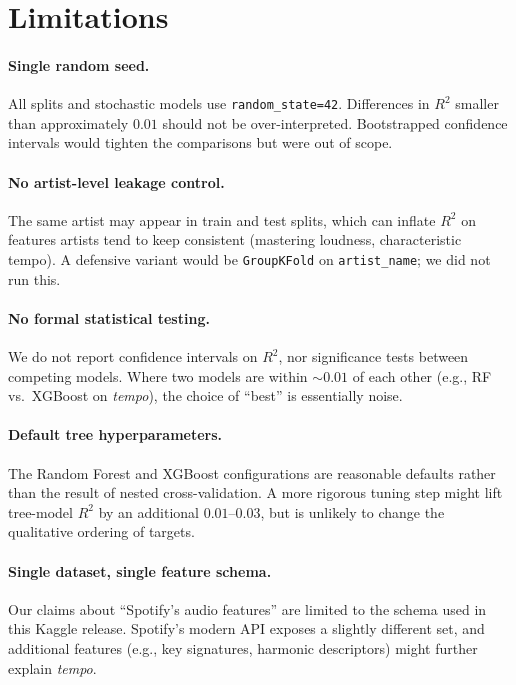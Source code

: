 \documentclass[11pt]{article}
\begin{document}
\section{Limitations}

\paragraph{Single random seed.} All splits and stochastic models use \texttt{random\_state=42}. Differences in $R^2$ smaller than approximately $0.01$ should not be over-interpreted. Bootstrapped confidence intervals would tighten the comparisons but were out of scope.

\paragraph{No artist-level leakage control.} The same artist may appear in train and test splits, which can inflate $R^2$ on features artists tend to keep consistent (mastering loudness, characteristic tempo). A defensive variant would be \texttt{GroupKFold} on \texttt{artist\_name}; we did not run this.

\paragraph{No formal statistical testing.} We do not report confidence intervals on $R^2$, nor significance tests between competing models. Where two models are within $\sim 0.01$ of each other (e.g., RF vs.\ XGBoost on \emph{tempo}), the choice of ``best'' is essentially noise.

\paragraph{Default tree hyperparameters.} The Random Forest and XGBoost configurations are reasonable defaults rather than the result of nested cross-validation. A more rigorous tuning step might lift tree-model $R^2$ by an additional $0.01$--$0.03$, but is unlikely to change the qualitative ordering of targets.

\paragraph{Single dataset, single feature schema.} Our claims about ``Spotify's audio features'' are limited to the schema used in this Kaggle release. Spotify's modern API exposes a slightly different set, and additional features (e.g., key signatures, harmonic descriptors) might further explain \emph{tempo}.
\end{document}
